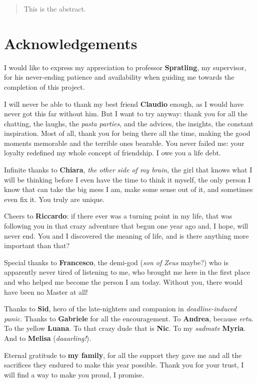 \documentclass[11pt,a4paper]{report}
\begin{document}
	
	
	
	\begin{abstract}
		This is the abstract.
	\end{abstract}
	
	
	\chapter*{Acknowledgements}
	I would like to express my appreciation to professor \textbf{Spratling}, my supervisor, for his never-ending patience and availability when guiding me towards the completion of this project.
	
	I will never be able to thank my best friend \textbf{Claudio} enough, as I would have never got this far without him. But I want to try anyway: thank you for all the chatting, the laughs, the \emph{pasta parties}, and the advices, the insights, the constant inspiration. Most of all, thank you for being there all the time, making the good moments memorable and the terrible ones bearable. You never failed me: your loyalty redefined my whole concept of friendship. I owe you a life debt.
	
	Infinite thanks to \textbf{Chiara}, \emph{the other side of my brain}, the girl that knows what I will be thinking before I even have the time to think it myself, the only person I know that can take the big mess I am, make some sense out of it, and sometimes even fix it. You truly are unique.
	
	Cheers to \textbf{Riccardo}: if there ever was a turning point in my life, that was following you in that crazy adventure that begun one year ago and, I hope, will never end. You and I discovered the meaning of life, and is there anything more important than that?
	
	Special thanks to \textbf{Francesco}, the demi-god (\emph{son of Zeus} maybe?) who is apparently never tired of listening to me, who brought me here in the first place and who helped me become the person I am today. Without you, there would have been no Master at all!
	
	Thanks to \textbf{Sid}, hero of the late-nighters and companion in \emph{deadline-induced panic}. Thanks to \textbf{Gabriele} for all the encouragement. To \textbf{Andrea}, because \emph{ertu}. To the yellow \textbf{Luana}. To that crazy dude that is \textbf{Nic}. To my \emph{sadmate} \textbf{Myria}. And to \textbf{Melisa} (\emph{daaarling!}).
	
	Eternal gratitude to \textbf{my family}, for all the support they gave me and all the sacrifices they endured to make this year possible. Thank you for your trust, I will find a way to make you proud, I promise.
	
\end{document}
